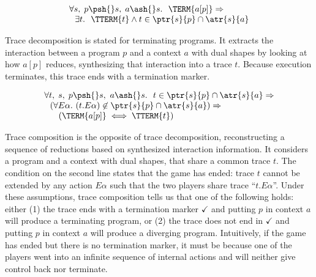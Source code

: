 \documentclass[10pt, conference, compsocconf, letterpaper, times]{IEEEtran}
\begin{document}
\begin{lemma}
\label{lemma:trace-decomp}
\[
\begin{array}{l}
  \forall s,\; p \psh{}s,\; a \ash{}s.~~
  \TERM{a[p]} \Rightarrow \\
  ~~\exists t.~~ \TTERM{t} \wedge t \in \ptr{s}{p} \cap \atr{s}{a}
\end{array}
\]
\end{lemma}

Trace decomposition is stated for terminating programs.
It extracts the interaction
between a program $p$ and a context $a$
with dual shapes by looking at how $a[p]$ reduces, synthesizing that
interaction into a trace $t$.
Because execution terminates, this trace ends with a
termination marker.

\begin{lemma}
\label{lemma:trace-comp}
\[
\begin{array}{l}
  \forall t,\; s,\; p \psh{}s,~ a \ash{}s.~~
  t \in \ptr{s}{p} \cap \atr{s}{a} \Rightarrow \\
  ~~ ( \forall E\alpha.~(t.E\alpha) \not\in \ptr{s}{p} \cap \atr{s}{a} ) \Rightarrow \\
  ~~~~~(\TERM{a[p]} \iff \TTERM{t})
\end{array}
\]
\ifsooner{}
  \fi
\end{lemma}

Trace composition is the opposite of trace decomposition, 
reconstructing a sequence of reductions based on synthesized interaction
information.
It considers a program and a context with dual shapes, that share a
common trace $t$.
The condition on the second line states that the game has ended:
trace $t$ cannot be extended by any action $E\alpha$ such that the
two players share trace ``$t.E\alpha$''.
Under these assumptions, trace composition tells us that one of the
following holds:
either (1) the trace ends with a termination marker $\checkmark$ and
putting $p$ in context $a$ will produce a terminating
program,
or (2) the trace does not end in $\checkmark$
and putting $p$ in context $a$ will produce a diverging program.
Intuitively, if the game has ended but there is no termination
marker, it must be because one of the players went into an
infinite sequence of internal actions and will neither give control
back nor terminate.
\end{document}
